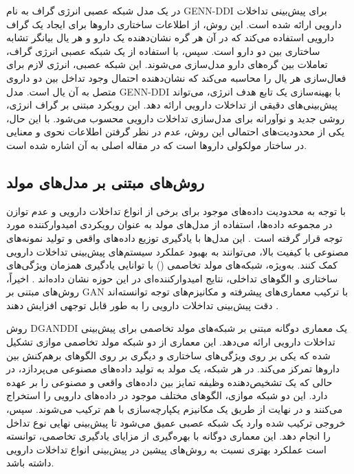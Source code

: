 در \cite{ref_xu2019} یک مدل شبکه عصبی انرژی گراف به نام GENN-DDI برای پیش‌بینی تداخلات دارویی ارائه شده است. این روش، از اطلاعات ساختاری داروها برای ایجاد یک گراف دارویی استفاده می‌کند که در آن هر گره نشان‌دهنده یک دارو و هر یال بیانگر تشابه ساختاری بین دو دارو است. سپس، با استفاده از یک شبکه عصبی انرژی گراف، تعاملات بین گره‌های دارو مدل‌سازی می‌شوند. این شبکه عصبی، انرژی لازم برای فعال‌سازی هر یال را محاسبه می‌کند که نشان‌دهنده احتمال وجود تداخل بین دو داروی متصل به آن یال است. مدل GENN-DDI با بهینه‌سازی یک تابع هدف انرژی، می‌تواند پیش‌بینی‌های دقیقی از تداخلات دارویی ارائه دهد. این رویکرد مبتنی بر گراف انرژی، روشی جدید و نوآورانه برای مدل‌سازی تداخلات دارویی محسوب می‌شود. با این حال، یکی از محدودیت‌های احتمالی این روش، عدم در نظر گرفتن اطلاعات نحوی و معنایی در ساختار مولکولی داروها است که در مقاله اصلی \cite{ref_xu2019} به آن اشاره شده است.


\subsection{روش‌های مبتنی بر مدل‌های مولد}

با توجه به محدودیت داده‌های موجود برای برخی از انواع تداخلات دارویی و عدم توازن در مجموعه داده‌ها، استفاده از مدل‌های مولد به عنوان رویکردی امیدوارکننده مورد توجه قرار گرفته است \cite{ref_yu2023}. این مدل‌ها با یادگیری توزیع داده‌های واقعی و تولید نمونه‌های مصنوعی با کیفیت بالا، می‌توانند به بهبود عملکرد سیستم‌های پیش‌بینی تداخلات دارویی کمک کنند. به‌ویژه، شبکه‌های مولد تخاصمی () با توانایی یادگیری همزمان ویژگی‌های ساختاری و الگوهای تداخلی، نتایج امیدوارکننده‌ای در این حوزه نشان داده‌اند \cite{ref_zhang2024}. اخیراً، روش‌های مبتنی بر GAN با ترکیب معماری‌های پیشرفته و مکانیزم‌های توجه توانسته‌اند دقت پیش‌بینی تداخلات دارویی را به طور قابل توجهی افزایش دهند \cite{ref_he2023}.

روش DGANDDI \cite{ref_yu2023} یک معماری دوگانه مبتنی بر شبکه‌های مولد تخاصمی برای پیش‌بینی تداخلات دارویی ارائه می‌دهد. این معماری از دو شبکه مولد تخاصمی موازی تشکیل شده که یکی بر روی ویژگی‌های ساختاری و دیگری بر روی الگوهای برهم‌کنش بین داروها تمرکز می‌کند. در هر شبکه، یک مولد به تولید داده‌های مصنوعی می‌پردازد، در حالی که یک تشخیص‌دهنده وظیفه تمایز بین داده‌های واقعی و مصنوعی را بر عهده دارد. این دو شبکه موازی، الگوهای مختلف موجود در داده‌های دارویی را استخراج می‌کنند و در نهایت از طریق یک مکانیزم یکپارچه‌سازی با هم ترکیب می‌شوند. سپس، خروجی ترکیب شده وارد یک شبکه عصبی عمیق می‌شود تا پیش‌بینی نهایی نوع تداخل را انجام دهد. این معماری دوگانه با بهره‌گیری از مزایای یادگیری تخاصمی، توانسته است عملکرد بهتری نسبت به روش‌های پیشین در پیش‌بینی انواع تداخلات دارویی داشته باشد.

